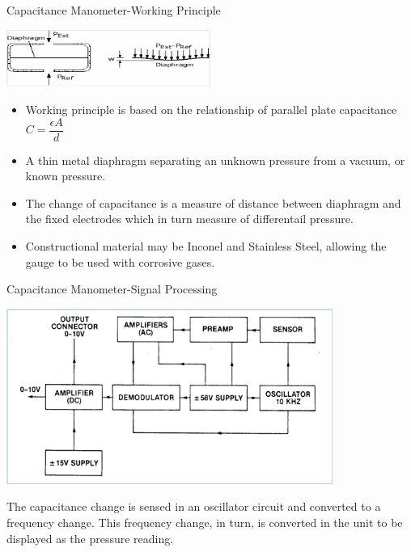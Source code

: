 \documentclass[11pt]{beamer}
\begin{document}
\begin{frame}{Capacitance Manometer-Working Principle }

       \begin{center}
			\includegraphics[width=0.5\textwidth]{CapacitanceMano2.png}
			
		\end{center}

			\begin{block}

			   \begin{itemize}

                    \item  Working principle is based on the relationship of parallel plate capacitance $C=\dfrac{\epsilon A}{d}$

					\item   A  thin metal diaphragm separating an unknown pressure from a vacuum, or known pressure. 
 
					\item  The change of  capacitance is a measure of distance between  diaphragm and the fixed electrodes which in turn measure of differentail pressure.
 
					\item   Constructional material may be Inconel and Stainless Steel, allowing the gauge to be used with corrosive gases. 			   		   
			   \end{itemize}
			
			\end{block}

\end{frame}


\begin{frame}{Capacitance Manometer-Signal Processing }
		
		\begin{center}
			\includegraphics[width=0.8\textwidth]{CapacitanceManoCtrlCkt.png}
		\end{center}

The capacitance change is sensed in an oscillator circuit and converted to a frequency change.
This frequency change, in turn, is converted in the unit to be displayed as the pressure reading.


\end{frame}
\end{document}
